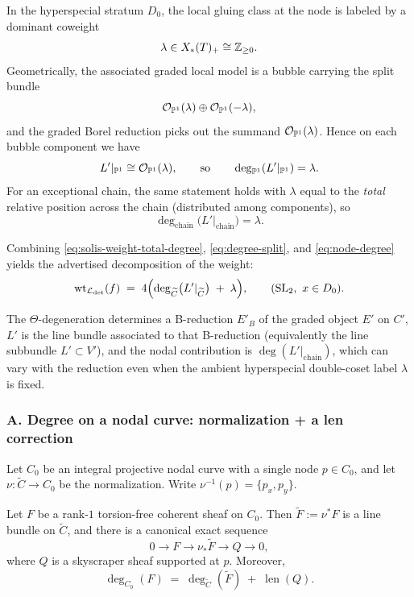 \documentclass[12pt]{article}
\DeclareMathOperator{\len}{len}
\begin{document}
In the hyperspecial stratum $D_0$, the local gluing class at the node is labeled
by a dominant coweight
\[
\lambda\in X_*(T)_+\cong\Z_{\ge 0}.
\]
Geometrically, the associated graded local model is a bubble carrying the split
bundle
\[
\mathcal O_{\P^1}(\lambda)\oplus \mathcal O_{\P^1}(-\lambda),
\]
and the graded Borel reduction picks out the summand $\mathcal O_{\P^1}(\lambda)$.
Hence on each bubble component we have
\[
L'|_{\P^1}\cong \mathcal O_{\P^1}(\lambda),
\qquad\text{so}\qquad
\deg_{\P^1}(L'|_{\P^1})=\lambda.
\]
For an exceptional chain, the same statement holds with $\lambda$ equal to the
\emph{total} relative position across the chain (distributed among components), so
\begin{equation}
\label{eq:node-degree}
\deg_{\mathrm{chain}}\!\big(L'|_{\mathrm{chain}}\big)=\lambda.
\end{equation}

Combining \eqref{eq:solis-weight-total-degree}, \eqref{eq:degree-split}, and
\eqref{eq:node-degree} yields the advertised decomposition of the weight:
\begin{equation}
\label{eq:solis-weight-final}
\wt_{\mathcal L_{\det}}(f)
\;=\;
4\Bigl(\deg_{\widetilde C}\!\big(L'|_{\widetilde C}\big)\;+\;\lambda\Bigr),
\qquad (\SL_2,\ x\in D_0).
\end{equation}

The $\Theta$-degeneration determines a B-reduction $E'_B$ of the graded object $E'$ on $C'$, $L'$ is the line bundle associated to that B-reduction (equivalently the line subbundle $L'\subset V'$), and the nodal contribution is $\deg(L'|_{\text{chain}})$, which can vary with the reduction even when the ambient hyperspecial double-coset label $\lambda$ is fixed.

\subsubsection*{A. Degree on a nodal curve: normalization + a len correction}

Let $C_0$ be an integral projective nodal curve with a single node $p\in C_0$,
and let $\nu:\widetilde C\to C_0$ be the normalization. Write
$\nu^{-1}(p)=\{p_x,p_y\}$.

\begin{lemma}
\label{lem:degree-normalization-len}
Let $F$ be a rank-$1$ torsion-free coherent sheaf on $C_0$. Then
$\widetilde F:=\nu^*F$ is a line bundle on $\widetilde C$, and there is a
canonical exact sequence
\begin{equation}
\label{eq:nu-push-exact}
0 \longrightarrow F \longrightarrow \nu_*\widetilde F \longrightarrow Q \longrightarrow 0,
\end{equation}
where $Q$ is a skyscraper sheaf supported at $p$. Moreover,
\begin{equation}
\label{eq:deg-split-len}
\deg_{C_0}(F)
\;=\;
\deg_{\widetilde C}(\widetilde F)
\;+\;
\len(Q).
\end{equation}
\end{lemma}
\end{document}
